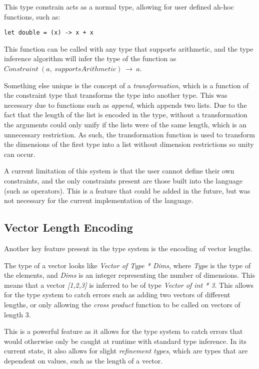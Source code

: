 This type constrain acts as a normal type, allowing for user defined ah-hoc functions, such as:

\begin{verbatim}
let double = (x) -> x + x
\end{verbatim}

This function can be called with any type that supports arithmetic, and the type inference algorithm will infer the
type of the function as \textit{$Constraint\ (a,\ supportsArithmetic)\ \rightarrow\ a$}.

Something else unique is the concept of a \textit{transformation}, which is a function of the constraint type that
transforms the type into another type.
This was necessary due to functions such as \textit{append}, which appends two lists.
Due to the fact that the length of the list is encoded in the type, without a transformation the arguments could 
only unify if the lists were of the same length, which is an unnecessary restriction.
As such, the transformation function is used to transform the dimensions of the first type into a list without 
dimension restrictions so unity can occur.

A current limitation of this system is that the user cannot define their own constraints, and the only constraints 
present are those built into the language (such as operators).
This is a feature that could be added in the future, but was not necessary for the current implementation of the
language.

\subsection{Vector Length Encoding}\label{subsec:vector-length-enc}

Another key feature present in the type system is the encoding of vector lengths.

The type of a vector looks like \textit{Vector of Type * Dims}, where \textit{Type} is the type of the elements, and \textit{Dims} is an integer representing the number of dimensions.
This means that a vector \textit{[1,2,3]} is inferred to be of type \textit{Vector of int * 3}.
This allows for the type system to catch errors such as adding two vectors of different lengths, or only allowing the \textit{cross product} 
function to be called on vectors of length 3.

This is a powerful feature as it allows for the type system to catch errors that would otherwise only be caught at 
runtime with standard type inference.
In its current state, it also allows for slight \textit{refinement types}\citep{freeman1991refinement}, which are types that are dependent on values, such as the length of a vector.


